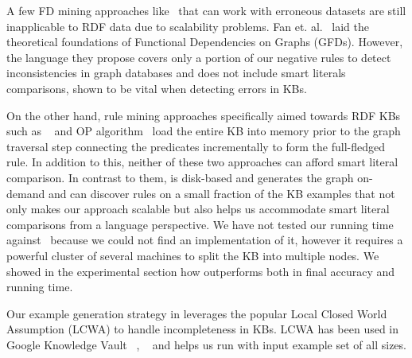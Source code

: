 A few FD mining approaches like~\cite{abedjan2015temporal,kivinen1995approximate} that can work with erroneous datasets are still inapplicable to RDF data due to scalability problems.
Fan et. al.~\cite{FanFDGraphs} laid the theoretical foundations of Functional Dependencies on Graphs (GFDs). 
However, the language they propose covers only a portion of our negative rules to detect inconsistencies in graph databases and does not include smart literals comparisons, 
shown to be vital when detecting errors in KBs.

On the other hand, rule mining approaches specifically aimed towards RDF KBs such as \amie~\cite{galarraga2015fast} and OP algorithm~\cite{Chen:2016} load the entire KB into memory prior to 
the graph traversal step connecting the predicates incrementally to form the full-fledged rule. In addition to this, neither of these two approaches can afford smart literal comparison. 
In contrast to them, \krd is disk-based and generates the graph on-demand and can discover rules on a small fraction of the KB examples that not only makes our approach scalable but also helps us 
accommodate smart literal comparisons from a language perspective. 
We have not tested our running time against~\cite{Chen:2016} because we could not find an implementation of it, 
however it requires a powerful cluster of several machines to split the KB into multiple nodes. 
We showed in the experimental section how \krd outperforms \amie both in final accuracy and running time.

Our example generation strategy in \krd leverages the popular Local Closed World Assumption (LCWA) to handle incompleteness in KBs. LCWA has been used in Google Knowledge Vault
~\cite{dong2014data,dong2015knowledge}, \amie~\cite{galarraga2015fast} and helps us run with input example set of all sizes.

